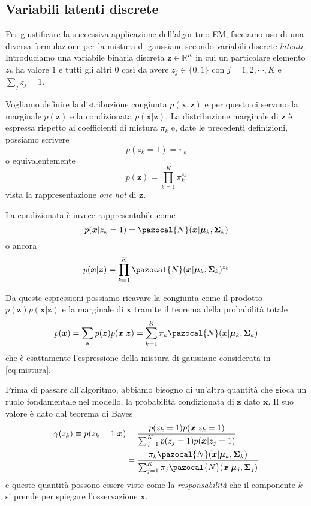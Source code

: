 \documentclass{report}
\begin{document}
\subsection{Variabili latenti discrete}

Per giustificare la successiva applicazione dell'algoritmo EM, facciamo uso di una diversa formulazione per la mistura di gaussiane secondo variabili discrete \textit{latenti}. Introduciamo una variabile binaria discreta $\bm{z}\in\mathbb{R}^K$ in cui un particolare elemento $z_k$ ha valore $1$ e tutti gli altri $0$ così da avere $z_j\in\{0,1\}$ con $j=1,2,\cdots,K$ e $\sum_j z_j = 1$.

Vogliamo definire la distribuzione congiunta $p(\bm{x},\bm{z})$ e per questo ci servono la marginale $p(\bm{z})$ e la condizionata $p(\bm{x}|\bm{z})$. La distribuzione marginale di $\bm{z}$ è espressa rispetto ai coefficienti di mistura $\pi_k$ e, date le precedenti definizioni, possiamo scrivere
\begin{equation}
p(z_k=1) = \pi_k
\end{equation}
o equivalentemente
\begin{equation}
p(\bm{z}) = \prod_{k=1}^K \pi_k^{z_k}
\end{equation}
vista la rappresentazione \textit{one hot} di $\bm{z}$.

La condizionata è invece rappresentabile come
\begin{equation}
p(\bm{x}|z_k=1) = \pazocal{N}(\bm{x}|\bm\mu_k, \bm\Sigma_k)
\end{equation}
o ancora
\begin{equation}
p(\bm{x}|\bm{z}) = \prod_{k=1}^K \pazocal{N}(\bm{x}|\bm\mu_k, \bm\Sigma_k)^{z_k}
\end{equation}

Da queste espressioni possiamo ricavare la congiunta come il prodotto $p(\bm{z})p(\bm{x}|\bm{z})$ e la marginale di $\bm{x}$ tramite il teorema della probabilità totale
\begin{equation}
p(\bm{x}) = \sum_{\bm{z}} p(\bm{z})p(\bm{x}|\bm{z}) = \sum_{k=1}^{K} \pi_k\pazocal{N}(\bm{x}|\bm\mu_k, \bm\Sigma_k)
\end{equation}
che è esattamente l'espressione della mistura di gaussiane considerata in \eqref{eq:mistura}.

Prima di passare all'algoritmo, abbiamo bisogno di un'altra quantità che gioca un ruolo fondamentale nel modello, la probabilità condizionata di $\bm{z}$ dato $\bm{x}$. Il suo valore è dato dal teorema di Bayes
\begin{equation}\label{eq:gamma}
\begin{aligned}
\gamma(z_k) \equiv p(z_k=1|\bm{x}) &= \frac{p(z_k=1)p(\bm{x}|z_k=1)}{\sum_{j=1}^K p(z_j=1)p(\bm{x}|z_j=1)}=\\
&= \frac{\pi_k\pazocal{N}(\bm{x}|\bm\mu_k, \bm\Sigma_k)}{\sum_{j=1}^{K} \pi_j\pazocal{N}(\bm{x}|\bm\mu_j, \bm\Sigma_j)}
\end{aligned}
\end{equation}
e queste quantità possono essere viste come la \textit{responsabilità} che il componente $k$ si prende per spiegare l'osservazione $\bm{x}$.
\end{document}
